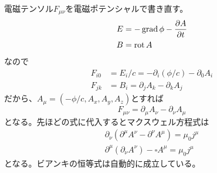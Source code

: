 
    電磁テンソル$F_{\mu\nu}$を電磁ポテンシャルで書き直す。
    \begin{align*}
        E &= -\operatorname{grad}\phi - \pdv{A}{t}\\
        B &= \operatorname{rot} A
    \end{align*}
    なので
    \begin{align*}
        F_{i0} &= E_i / c = -\partial_i (\phi / c) - \partial_0 A_i\\
        F_{jk} &= B_i = \partial_j A_k - \partial_k A_j
    \end{align*}
    だから、$A_\mu = (-\phi / c, A_x, A_y, A_z)$とすれば
        \[F_{\mu\nu} = \partial_\mu A_\nu - \partial_\nu A_\mu\]
    となる。先ほどの式に代入するとマクスウェル方程式は
    \begin{align*}
        \partial_\nu(\partial^\mu A^\nu - \partial^\nu A^\mu) = \mu_0 j^\mu\\
        \partial^\mu(\partial_\nu A^\nu) - \square A^\mu = \mu_0 j^\mu
    \end{align*}
    となる。ビアンキの恒等式は自動的に成立している。


